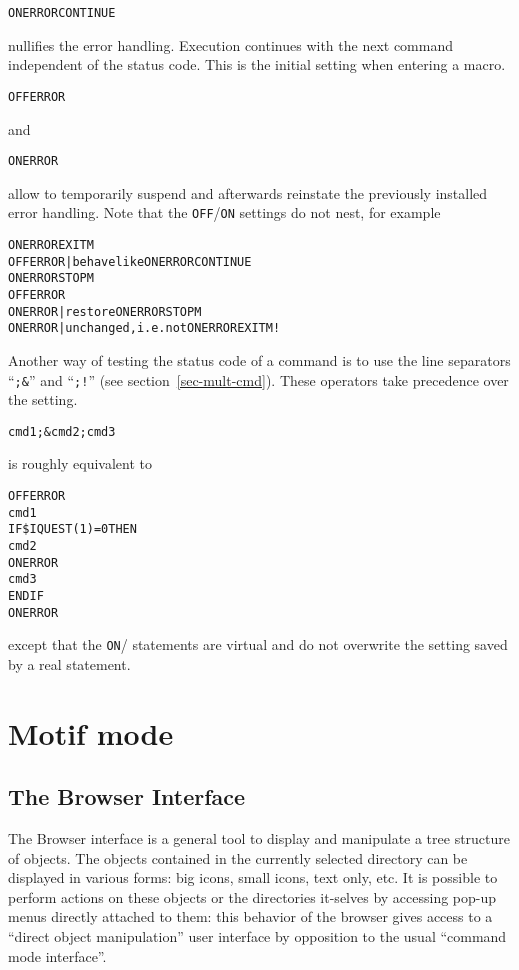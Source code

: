 \begin{alltt}
ON ERROR CONTINUE
\end{alltt}
nullifies the error handling.
Execution continues with the next command independent of the status
code.
This is the initial setting when entering a macro.

\begin{alltt}
OFF ERROR
\end{alltt}
and
\begin{alltt}
ON ERROR
\end{alltt}
allow to temporarily suspend and afterwards reinstate the previously
installed error handling.
Note that the \texttt{OFF}/\texttt{ON} settings do not nest, for example
\begin{alltt}
ON  ERROR EXITM
OFF ERROR        | behave like ON ERROR CONTINUE
ON  ERROR STOPM
OFF ERROR
ON  ERROR        | restore ON ERROR STOPM
ON  ERROR        | unchanged, i.e. not ON ERROR EXITM !
\end{alltt}

Another way of testing the status code of a command is to use the line
separators ``\texttt{;\&}'' and ``\texttt{;!}'' (see
section~\ref{sec-mult-cmd}).
These operators take precedence over the  setting.
\begin{alltt}
cmd1 ;& cmd2 ; cmd3
\end{alltt}
is roughly equivalent to
\begin{alltt}
OFF ERROR
cmd1 
IF \$IQUEST(1)=0 THEN 
   cmd2
   ON ERROR
   cmd3
ENDIF
ON ERROR
\end{alltt}
except that the \texttt{ON}/ statements are virtual and
do not overwrite the setting saved by a real  statement.

\section{Motif mode}


\subsection{The Browser Interface}
\label{ref:rebrowser}


The Browser interface is a general tool to display and manipulate a tree 
structure of objects. The objects contained in the currently selected directory 
can be displayed in various forms: big icons, small icons, text only, etc. It 
is possible to perform actions on these objects or the directories it-selves by
accessing pop-up menus directly attached to them: this behavior of the browser 
gives access to a ``direct object manipulation'' user interface by opposition 
to the usual ``command mode interface''.

